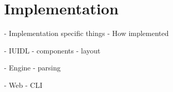 
\chapter{Implementation} \label{implementation}

- Implementation specific things
- How implemented


- IUIDL
  - components
  - layout

- Engine
  - parsing
  
- Web
- CLI